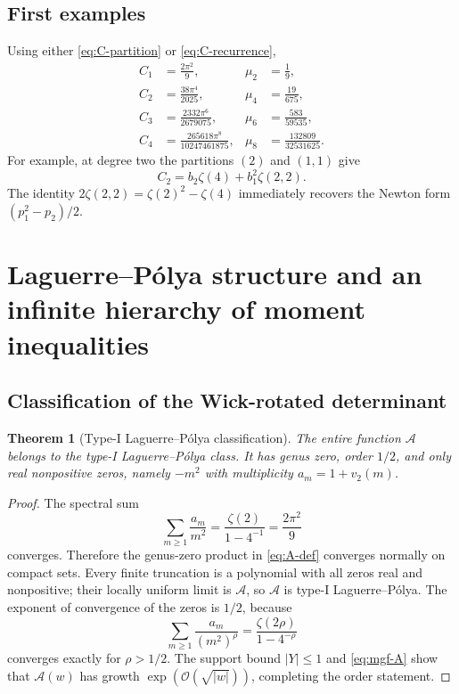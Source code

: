\documentclass[11pt,oneside]{article}
\newtheorem{theorem}{Theorem}[section]
\theoremstyle{definition}
\theoremstyle{remark}
\newcommand{\bigO}{\mathcal O}
\begin{document}
\subsection{First examples}

Using either \cref{eq:C-partition} or \cref{eq:C-recurrence},
\begin{align}
 C_1&=\frac{2\pi^2}{9},
 &\mu_2&=\frac19,\label{eq:first-moments-a}\\
 C_2&=\frac{38\pi^4}{2025},
 &\mu_4&=\frac{19}{675},\\
 C_3&=\frac{2332\pi^6}{2679075},
 &\mu_6&=\frac{583}{59535},\\
 C_4&=\frac{265618\pi^8}{10247461875},
 &\mu_8&=\frac{132809}{32531625}.\label{eq:first-moments-b}
\end{align}
For example, at degree two the partitions $(2)$ and $(1,1)$ give
\begin{equation}\label{eq:C2-MZV}
 C_2=b_2\zeta(4)+b_1^2\zeta(2,2).
\end{equation}
The identity $2\zeta(2,2)=\zeta(2)^2-\zeta(4)$ immediately recovers the
Newton form $(p_1^2-p_2)/2$.

\section{Laguerre--P\'olya structure and an infinite hierarchy of moment inequalities}

\subsection{Classification of the Wick-rotated determinant}

\begin{theorem}[Type-I Laguerre--P\'olya classification]\label{thm:LP}
The entire function $\mathcal A$ belongs to the type-I Laguerre--P\'olya class.
It has genus zero, order $1/2$, and only real nonpositive zeros, namely
$-m^2$ with multiplicity $a_m=1+v_2(m)$.
\end{theorem}

\begin{proof}
The spectral sum
\[
 \sum_{m\ge1}\frac{a_m}{m^2}=\frac{\zeta(2)}{1-4^{-1}}
 =\frac{2\pi^2}{9}
\]
converges.  Therefore the genus-zero product in \cref{eq:A-def} converges
normally on compact sets.  Every finite truncation is a polynomial with all
zeros real and nonpositive; their locally uniform limit is $\mathcal A$, so
$\mathcal A$ is type-I Laguerre--P\'olya.  The exponent of convergence of the
zeros is $1/2$, because
\[
 \sum_{m\ge1}\frac{a_m}{(m^2)^\rho}
 =\frac{\zeta(2\rho)}{1-4^{-\rho}}
\]
converges exactly for $\rho>1/2$.  The support bound $|Y|\le1$ and
\cref{eq:mgf-A} show that $\mathcal A(w)$ has growth
$\exp(\bigO(\sqrt{|w|}))$, completing the order statement.
\end{proof}
\end{document}
